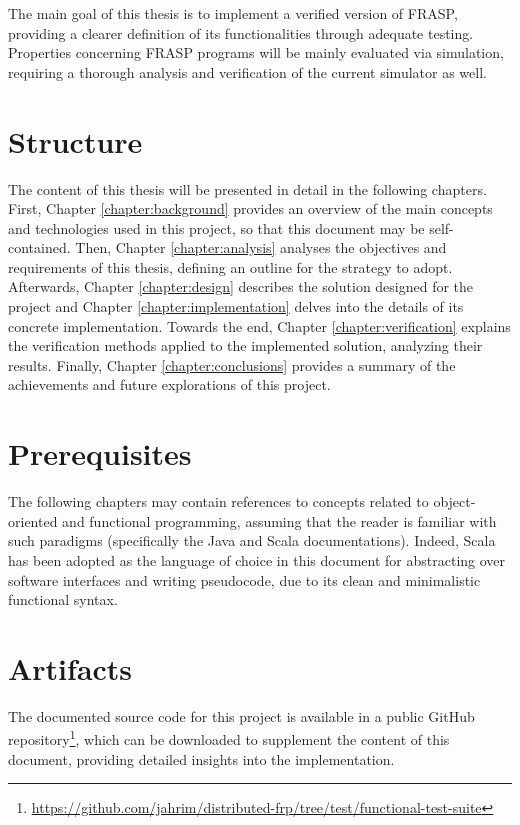 The main goal of this thesis is to implement a verified version of FRASP,
providing a clearer definition of its functionalities through adequate testing.
Properties concerning FRASP programs will be mainly evaluated via simulation,
requiring a thorough analysis and verification of the current simulator as
well.

\section{Structure}
\label{section:introduction:structure}

The content of this thesis will be presented in detail in the following
chapters. First, Chapter \ref{chapter:background} provides an overview of the
main concepts and technologies used in this project, so that this document may
be self-contained. Then, Chapter \ref{chapter:analysis} analyses the objectives
and requirements of this thesis, defining an outline for the strategy to adopt.
Afterwards, Chapter \ref{chapter:design} describes the solution designed for
the project and Chapter \ref{chapter:implementation} delves into the details of
its concrete implementation. Towards the end, Chapter
\ref{chapter:verification} explains the verification methods applied to the
implemented solution, analyzing their results. Finally, Chapter
\ref{chapter:conclusions} provides a summary of the achievements and future
explorations of this project.

\section{Prerequisites}
\label{section:introduction:prerequisites}

The following chapters may contain references to concepts related to
object-orient\-ed and functional programming, assuming that the reader is
familiar with such paradigms (specifically the Java \cite{Java} and Scala
\cite{Scala} documentations). Indeed, Scala has been adopted as the language of
choice in this document for abstracting over software interfaces and writing
pseudocode, due to its clean and minimalistic functional syntax.

\section{Artifacts}
\label{section:introduction:artifacts}

The documented source code for this project is available in a public GitHub
repository\footnote{\url{https://github.com/jahrim/distributed-frp/tree/test/functional-test-suite}},
which can be downloaded to supplement the content of this document, providing
detailed insights into the implementation.